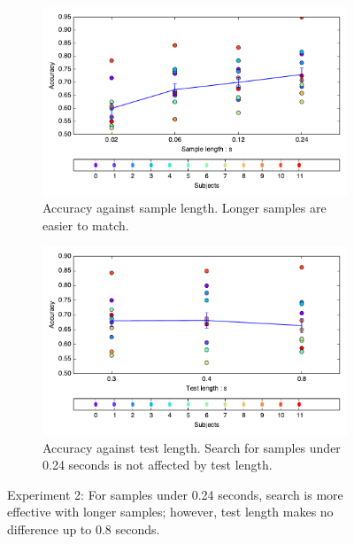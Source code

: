 \begin{figure}[htp]
\centering
\begin{subfigure}[b]{\textwidth}
\centering
                \includegraphics[width=12cm]{img/fig_fire4_correct_sampleL.pdf}
                \caption{Accuracy against sample length. Longer samples are easier to match.}
          
        \end{subfigure}
\begin{subfigure}[b]{\textwidth}
\centering
                \includegraphics[width=12cm]{img/fig_fire4_correct_testL.pdf}
                \caption{Accuracy against test length. Search for samples under 0.24 seconds is not affected by test length.}
         
        \end{subfigure}
\caption{Experiment 2: For samples under 0.24 seconds, search is more effective with longer samples; however, test length makes no difference up to 0.8 seconds.}
\end{figure}


